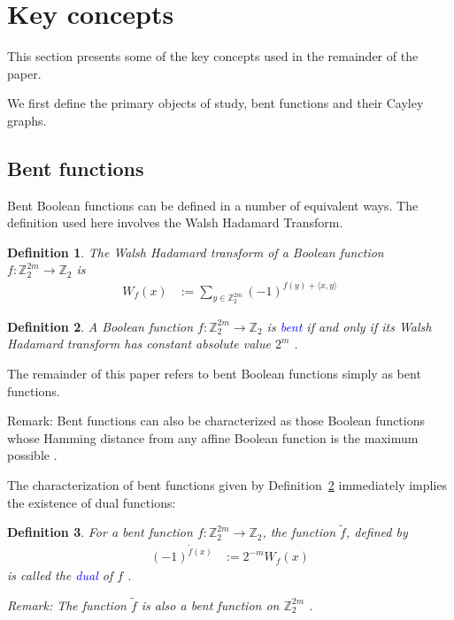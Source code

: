 \documentclass[12pt,a4paper]{article}
\newcommand{\mb}[1]{\mathbb{#1}}
\newcommand{\Z}{\mb{Z}}
\newcommand{\To}{\rightarrow}
\newcommand{\Emph}[1]{\emph{\textcolor{blue}{#1}}}
\newcommand{\dual}[1]{\widetilde{#1}}
\newtheorem{Definition}{Definition}
\begin{document}
\section{Key concepts}
\label{sec-Preliminaries}

This section presents some of the key concepts used in the remainder of the paper.

We first define the primary objects of study, bent functions and their Cayley graphs.

\subsection{Bent functions}

Bent Boolean functions can be defined in a number of equivalent ways.
The definition used here involves the Walsh Hadamard Transform.
\begin{Definition}
\label{def-Walsh-Hadamard-transform}
The Walsh Hadamard transform of
a Boolean function $f : \Z_2^{2m} \To \Z_2$ is
\begin{align*}
W_f(x)
&:=
\sum_{y \in \Z_2^{2m}} (-1)^{f(y) + \langle x, y \rangle}
\end{align*}
\end{Definition}

\begin{Definition}
\label{def-Bent-function}
A Boolean function $f : \Z_2^{2m} \To \Z_2$ is \Emph{bent}
if and only if its Walsh Hada\-mard transform has constant absolute value $2^{m}$ \cite[p.
74]{Dil74}
\cite[p. 300]{Rot76}.
\end{Definition}

The remainder of this paper refers to bent Boolean functions simply as bent functions.

Remark: Bent functions can also be characterized as those Boolean functions whose Hamming distance
from any affine Boolean function is the maximum possible \cite[Theorem 3.3]{MeiS90}.

The characterization of bent functions given by Definition~\ref{def-Bent-function} immediately
implies the existence of dual functions:
\begin{Definition}
\label{def-dual-Bent-function}
For a bent function $f : \Z_2^{2m} \To \Z_2$, the function $\dual{f}$, defined by
\begin{align*}
(-1)^{\dual{f}(x)} &:= 2^{-m} W_f(x)
\end{align*}
is called the \Emph{dual} of $f$ \cite{Tok11number}.

Remark: The function $\dual{f}$ is also a bent function on $\Z_2^{2m}$ \cite[p. 301]{Rot76}.
\end{Definition}
\end{document}
